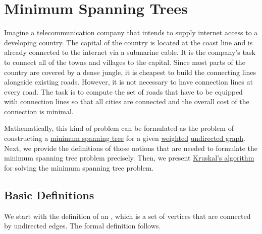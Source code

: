 \section{Minimum Spanning Trees}
Imagine a telecommunication company that intends to supply internet access to a developing country.
The capital of the country is located at the coast line and is already connected to the internet via
a submarine cable. It is the company's task to connect all of the towns and villages to the capital.
Since most parts of the country are covered by a dense jungle, it is cheapest to build the connecting lines
alongside existing roads.  However, it is not necessary to have connection lines at every road.  The task is to
compute the set of roads that have to be equipped with connection lines so that all cities are connected and
the overall cost of the connection is minimal.

Mathematically, this kind of problem can be formulated as the problem of
constructing a \href{https://en.wikipedia.org/wiki/Minimum_spanning_tree}{minimum spanning tree} for
a given \href{https://en.wikipedia.org/wiki/Graph_(discrete_mathematics)#Weighted_graph}{weighted}
\href{https://en.wikipedia.org/wiki/Graph_(discrete_mathematics)#Undirected_graph}{undirected graph}.
Next, we provide the definitions of those notions that are needed to formulate the minimum spanning
tree problem precisely.  Then, we present
\href{https://en.wikipedia.org/wiki/Kruskal%27s_algorithm}{Kruskal's algorithm} for solving the
minimum spanning tree problem. 

\subsection{Basic Definitions}
We start with the definition of an , which is a set of vertices that are connected by
undirected edges.  The formal definition follows.

